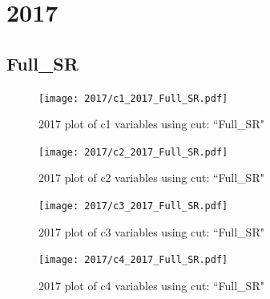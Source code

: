 \documentclass{article}
\begin{document}
    \section*{2017}
      \subsection*{Full\_SR}
                        \begin{figure}[H]
                            \centering
                            \caption{2017 plot of c1 variables using cut: ``Full\_SR"}
                            \texttt{[image: 2017/c1\_2017\_Full\_SR.pdf]}
                        \end{figure}    
                        \begin{figure}[H]
                            \centering
                            \caption{2017 plot of c2 variables using cut: ``Full\_SR"}
                            \texttt{[image: 2017/c2\_2017\_Full\_SR.pdf]}
                        \end{figure}    
                        \begin{figure}[H]
                            \centering
                            \caption{2017 plot of c3 variables using cut: ``Full\_SR"}
                            \texttt{[image: 2017/c3\_2017\_Full\_SR.pdf]}
                        \end{figure}    
                        \begin{figure}[H]
                            \centering
                            \caption{2017 plot of c4 variables using cut: ``Full\_SR"}
                            \texttt{[image: 2017/c4\_2017\_Full\_SR.pdf]}
                        \end{figure}    
\end{document}
